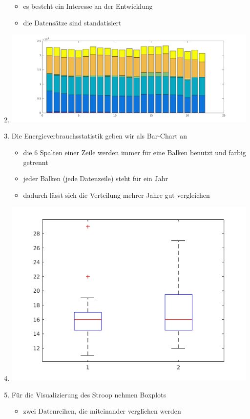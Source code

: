 \begin{enumerate}
\begin{itemize}
		\item es besteht ein Interesse an der Entwicklung
		\item die Datensätze sind standatisiert
	\end{itemize}
	\item \includegraphics{Graphik/energy_bar}
	\item Die Energieverbrauchsstatistik geben wir als Bar-Chart an
	\begin{itemize}
		\item die 6 Spalten einer Zeile werden immer für eine Balken benutzt und farbig getrennt
		\item jeder Balken (jede Datenzeile) steht für ein Jahr
		\item dadurch lässt sich die Verteilung mehrer Jahre gut vergleichen
	\end{itemize}
	\item \includegraphics{Graphik/stroop_box}
	\item Für die Visualizierung des Stroop nehmen Boxplots
	\begin{itemize}
		\item zwei Datenreihen, die miteinander verglichen werden

\end{itemize}
\end{enumerate}
